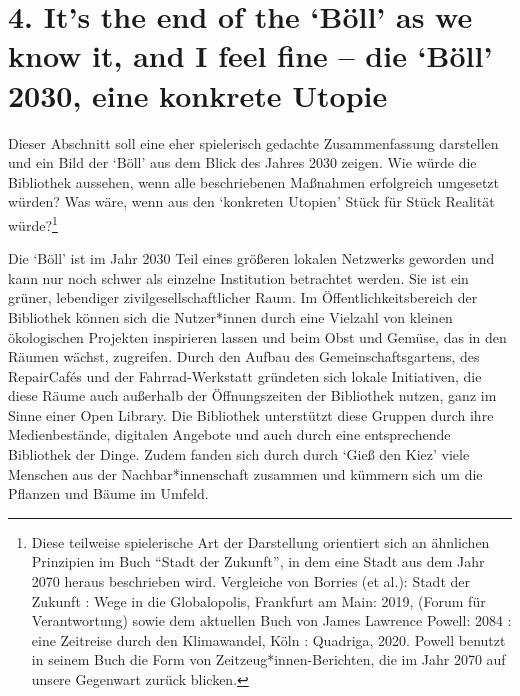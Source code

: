 \documentclass[a4paper,
fontsize=11pt,
oneside,
numbers=noperiodatend,
parskip=half-,
bibliography=totoc,
final
]{scrartcl}
\begin{document}
\hypertarget{its-the-end-of-the-buxf6ll-as-we-know-it-and-i-feel-fine-die-buxf6ll-2030-eine-konkrete-utopie}{%
\section{\texorpdfstring{4. It's the end of the \enquote*{Böll} as
we know it, and I feel fine -- die \enquote*{Böll} 2030, eine konkrete
Utopie}{4. It's the end of the `Böll' as we know it, and I feel fine -- die `Böll' 2030, eine konkrete Utopie}}\label{its-the-end-of-the-buxf6ll-as-we-know-it-and-i-feel-fine-die-buxf6ll-2030-eine-konkrete-utopie}}

Dieser Abschnitt soll eine eher spielerisch gedachte Zusammenfassung
darstellen und ein Bild der \enquote*{Böll} aus dem Blick des Jahres
2030 zeigen. Wie würde die Bibliothek aussehen, wenn alle beschriebenen
Maßnahmen erfolgreich umgesetzt würden? Was wäre, wenn aus den
\enquote*{konkreten Utopien} Stück für Stück Realität würde?\footnote{Diese
  teilweise spielerische Art der Darstellung orientiert sich an
  ähnlichen Prinzipien im Buch \enquote{Stadt der Zukunft}, in dem eine
  Stadt aus dem Jahr 2070 heraus beschrieben wird. Vergleiche von
  Borries (et al.): Stadt der Zukunft : Wege in die Globalopolis,
  Frankfurt am Main: 2019, (Forum für Verantwortung) sowie dem aktuellen
  Buch von James Lawrence Powell: 2084 : eine Zeitreise durch den
  Klimawandel, Köln : Quadriga, 2020. Powell benutzt in seinem Buch die
  Form von Zeitzeug*innen-Berichten, die im Jahr 2070 auf unsere
  Gegenwart zurück blicken.}

Die \enquote*{Böll} ist im Jahr 2030 Teil eines größeren lokalen
Netzwerks geworden und kann nur noch schwer als einzelne Institution
betrachtet werden. Sie ist ein grüner, lebendiger
zivilgesellschaftlicher Raum. Im Öffentlichkeitsbereich der Bibliothek
können sich die Nutzer*innen durch eine Vielzahl von kleinen
ökologischen Projekten inspirieren lassen und beim Obst und Gemüse, das
in den Räumen wächst, zugreifen. Durch den Aufbau des
Gemeinschaftsgartens, des RepairCafés und der Fahrrad-Werkstatt
gründeten sich lokale Initiativen, die diese Räume auch außerhalb der
Öffnungszeiten der Bibliothek nutzen, ganz im Sinne einer Open Library.
Die Bibliothek unterstützt diese Gruppen durch ihre Medienbestände,
digitalen Angebote und auch durch eine entsprechende Bibliothek der
Dinge. Zudem fanden sich durch durch \enquote*{Gieß den Kiez} viele
Menschen aus der Nachbar*innenschaft zusammen und kümmern sich um die
Pflanzen und Bäume im Umfeld.
\end{document}
